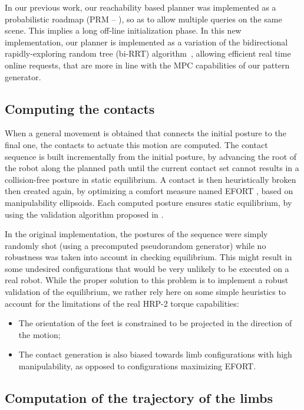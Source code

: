 In our previous work, our reachability based planner was implemented as a probabilistic roadmap (PRM -- \cite{kavraki_tra96}), so as to allow multiple queries on the same scene. This implies a long off-line initialization phase.
In this new implementation, our planner is implemented as a variation of the bidirectional rapidly-exploring random tree (bi-RRT) algorithm~\cite{lavalle_ijrr01}, allowing efficient real time online requests, that are more in line with the MPC capabilities of our pattern generator. 

\subsection{Computing the contacts}
When a general movement is obtained that connects the initial posture to the final one, the contacts to actuate this motion are computed. The contact sequence is built incrementally from the initial posture, by advancing the root of the robot along the planned path until the current contact set cannot results in a collision-free posture in static equilibrium. A contact is then heuristically broken then created again, by optimizing a comfort measure named EFORT \cite{tonneau_cg14}, based on manipulability ellipsoids. Each computed posture ensures static equilibrium, by using the validation algorithm proposed in \cite{qiu_dhm11}.

In the original implementation, the postures of the sequence were simply randomly shot (using a precomputed pseudorandom generator) while no robustness was taken into account in checking equilibrium. This might result in some undesired configurations that would be very unlikely to be executed on a real robot. While the proper solution to this problem is to implement a robust validation of the equilibrium, we rather rely here on some simple heuristics to account for the limitations of the real HRP-2 torque capabilities:
\begin{itemize}
\item The orientation of the feet is constrained to be projected in the direction of the motion;
\item The contact generation is also biased towards limb configurations with high manipulability, 
as opposed to configurations maximizing EFORT.
\end{itemize}

\subsection{Computation of the trajectory of the limbs}

